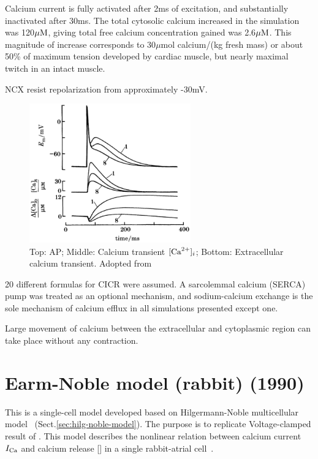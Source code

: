 Calcium current is fully activated after 2ms of excitation, and substantially
inactivated after 30ms.  The total cytosolic calcium increased in the simulation
was 120${\mu\text{M}}$, giving total free calcium concentration gained was 2.6${\mu\text{M}}$.
This magnitude of increase corresponds to 30$\mu$mol calcium/(kg fresh mass)
\citep{fabiato1983cir} or about 50\% of maximum tension developed by cardiac
muscle, but nearly maximal twitch in an intact muscle. 

NCX resist repolarization from approximately -30mV. 

\begin{figure}[hbt]
  \centerline{\includegraphics[height=6cm,
    angle=0]{./images/Hilgemann1987_Ca-transient.eps}}
  \caption{Top: AP; Middle: Calcium transient $[{\text{Ca}^{2+}}]_i$; Bottom:
  Extracellular calcium transient. Adopted from  \citep{hilgemann1987}}
\label{fig:Hilgemann1987_Ca-transient}
\end{figure}


20 different formulas for CICR were assumed.  A sarcolemmal calcium (SERCA) pump
was treated as an optional mechanism, and sodium-calcium exchange is the sole mechanism of
calcium efflux in all simulations presented except one. 

Large movement of calcium between the extracellular and cytoplasmic region can
take place without any contraction. 

\section[Earm-Noble model (1990)]{Earm-Noble model (rabbit) (1990)}
\label{sec:earm-noble-model}

This is a single-cell model developed based on Hilgermann-Noble multicellular
model~\citep{hilgemann1987} (Sect.\ref{sec:hilg-noble-model}). The purpose is to
replicate Voltage-clamped result of \citep{earm1990icg}. This model describes
the nonlinear relation between calcium current $I_{\ce{Ca}}$ and calcium release
[] in a single rabbit-atrial cell~\citep{earm1990msa}.

